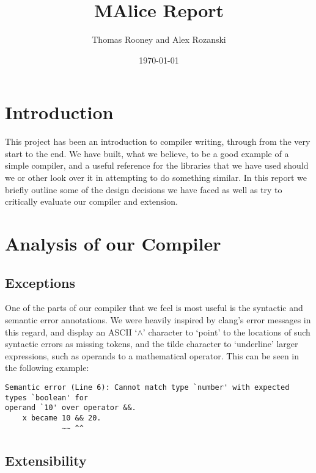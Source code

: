 \documentclass[a4wide, 11pt]{article}
\begin{document}
\title{MAlice Report}

\author{Thomas Rooney and Alex Rozanski}

\date{\today}

\maketitle

\section {Introduction}

This project has been an introduction to compiler writing, through from the very start to the end. We have built, what we believe, to be a good example of a simple compiler, and a useful reference for the libraries that we have used should we or other look over it in attempting to do something similar. In this report we briefly outline some of the design decisions we have faced as well as try to critically evaluate our compiler and extension.

\section{Analysis of our Compiler}

\subsection{Exceptions}

One of the parts of our compiler that we feel is most useful is the syntactic and semantic error annotations. We were heavily inspired by clang's error messages in this regard, and display an ASCII `$\wedge$' character to `point' to the locations of such syntactic errors as missing tokens, and the tilde character to `underline' larger expressions, such as operands to a mathematical operator. This can be seen in the following example:

\begin{verbatim}
Semantic error (Line 6): Cannot match type `number' with expected types `boolean' for
operand `10' over operator &&.
    x became 10 && 20.
             ~~ ^^  
\end{verbatim}

\subsection{Extensibility}
\end{document}
